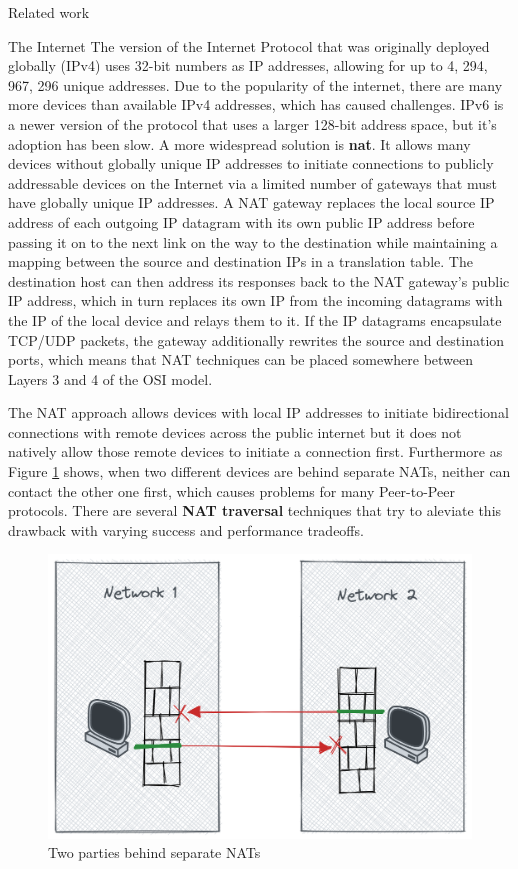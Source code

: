 \begin{frame}[fragile]{Related work}
\begin{block}{The Internet}
The version of the Internet Protocol that was originally deployed
globally (IPv4) uses 32-bit numbers as IP addresses, allowing for up to
4, 294, 967, 296 unique addresses. Due to the popularity of the
internet, there are many more devices than available IPv4 addresses,
which has caused challenges. IPv6 is a newer version of the protocol
that uses a larger 128-bit address space, but it's adoption has been
slow. A more widespread solution is \textbf{\gls{nat}}. It allows many
devices without globally unique IP addresses to initiate connections to
publicly addressable devices on the Internet via a limited number of
gateways that must have globally unique IP addresses. A NAT gateway
replaces the local source IP address of each outgoing IP datagram with
its own public IP address before passing it on to the next link on the
way to the destination while maintaining a mapping between the source
and destination IPs in a translation table. The destination host can
then address its responses back to the NAT gateway's public IP address,
which in turn replaces its own IP from the incoming datagrams with the
IP of the local device and relays them to it. If the IP datagrams
encapsulate TCP/UDP packets, the gateway additionally rewrites the
source and destination ports, which means that NAT techniques can be
placed somewhere between Layers 3 and 4 of the OSI model.

The NAT approach allows devices with local IP addresses to initiate
bidirectional connections with remote devices across the public internet
but it does not natively allow those remote devices to initiate a
connection first. Furthermore as Figure \ref{nat-intro} shows, when two
different devices are behind separate NATs, neither can contact the
other one first, which causes problems for many Peer-to-Peer protocols.
There are several \textbf{NAT traversal} techniques that try to aleviate
this drawback with varying success and performance tradeoffs.

\begin{figure}
\centering
\includegraphics[width=\textwidth,height=0.25\textheight]{thesis/../figures/nat-intro.png}
\caption{Two parties behind separate NATs\label{nat-intro}}
\end{figure}


\end{block}
\end{frame}
